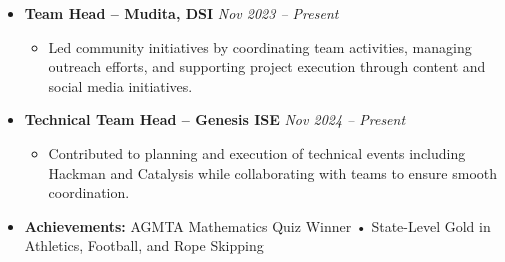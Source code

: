 \documentclass[letterpaper,11pt]{article}
\begin{document}
\begin{itemize}[leftmargin=0.15in,label={},itemsep=1pt,topsep=0pt]

\item
\textbf{Team Head -- Mudita, DSI}
\hfill
\textit{Nov 2023 -- Present}

\vspace{-5pt}

\begin{itemize}[leftmargin=0.2in,itemsep=0pt]
\item Led community initiatives by coordinating team activities, managing outreach efforts, and supporting project execution through content and social media initiatives.
\end{itemize}

\vspace{-6pt}

\item
\textbf{Technical Team Head -- Genesis ISE}
\hfill
\textit{Nov 2024 -- Present}

\vspace{-5pt}

\begin{itemize}[leftmargin=0.2in,itemsep=0pt]
\item Contributed to planning and execution of technical events including Hackman and Catalysis while collaborating with teams to ensure smooth coordination.
\end{itemize}

\vspace{-6pt}

\item
\textbf{Achievements:}
AGMTA Mathematics Quiz Winner • State-Level Gold in Athletics, Football, and Rope Skipping

\end{itemize}

\vspace{-10pt}
\end{document}
